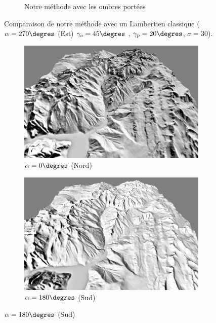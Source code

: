 \begin{figure}[h!]
\begin{subfigure}[t]{0.32\linewidth}
  \caption{Notre méthode avec les ombres portées}
 \end{subfigure}
 \caption{Comparaison de notre méthode avec un Lambertien classique ($\alpha = 270\degres$ (Est) $\gamma_o = 45\degres$ , $\gamma_p = 20\degres$, $\sigma = 30$).}
\end{figure}



\begin{figure}[h!]
\centering
 \begin{subfigure}[t]{0.24\linewidth}
   \centering
   \includegraphics[width=1.0\linewidth]{Resultats/2_nord_our.png}
   \caption{$\alpha = 0\degres$ (Nord)}
 \end{subfigure}
 \begin{subfigure}[t]{0.24\linewidth}
   \centering
   \includegraphics[width=1.0\linewidth]{Resultats/2_sud_our.png}
   \caption{$\alpha = 180\degres$ (Sud)}
 \end{subfigure}

\end{figure}
